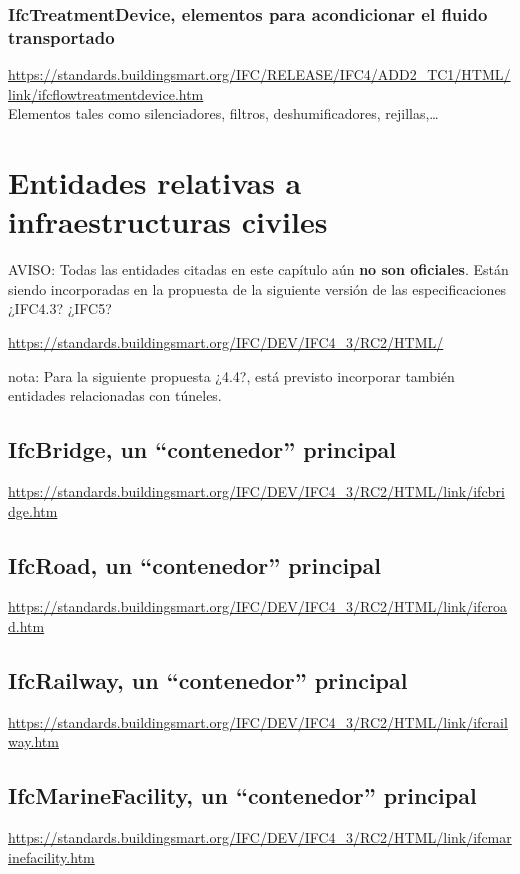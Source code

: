 \documentclass[spanish,12pt,a4paper,final,oneside]{book}
\begin{document}
\subsection{IfcTreatmentDevice, elementos para acondicionar el fluido transportado}
\url{https://standards.buildingsmart.org/IFC/RELEASE/IFC4/ADD2_TC1/HTML/link/ifcflowtreatmentdevice.htm}
\\Elementos tales como silenciadores, filtros, deshumificadores, rejillas,\ldots 







\chapter{Entidades relativas a infraestructuras civiles}\label{entidades_infraestructuras}
AVISO: Todas las entidades citadas en este capítulo aún \textbf{no son oficiales}. Están siendo incorporadas en la  propuesta de la siguiente versión de las especificaciones ¿IFC4.3?  ¿IFC5?

\url{https://standards.buildingsmart.org/IFC/DEV/IFC4_3/RC2/HTML/}

nota: Para la siguiente propuesta ¿4.4?, está previsto incorporar también entidades relacionadas con túneles.

\section{IfcBridge, un ``contenedor'' principal}
\url{https://standards.buildingsmart.org/IFC/DEV/IFC4_3/RC2/HTML/link/ifcbridge.htm}


\section{IfcRoad, un ``contenedor'' principal}
\url{https://standards.buildingsmart.org/IFC/DEV/IFC4_3/RC2/HTML/link/ifcroad.htm}


\section{IfcRailway, un ``contenedor'' principal}
\url{https://standards.buildingsmart.org/IFC/DEV/IFC4_3/RC2/HTML/link/ifcrailway.htm}


\section{IfcMarineFacility, un ``contenedor'' principal}
\url{https://standards.buildingsmart.org/IFC/DEV/IFC4_3/RC2/HTML/link/ifcmarinefacility.htm}
\end{document}
